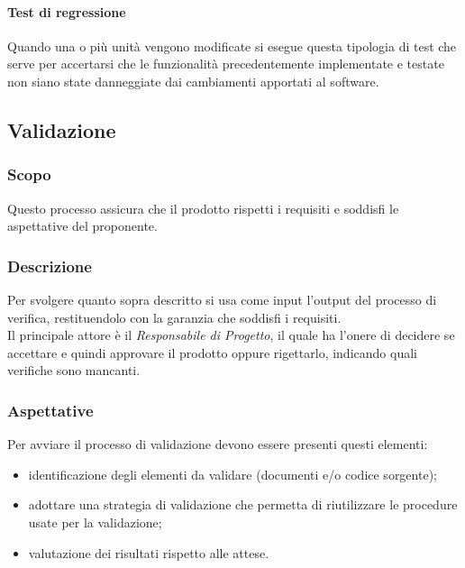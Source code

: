 \paragraph{Test di regressione}
Quando una o più unità vengono modificate si esegue questa tipologia di test che serve per accertarsi che le funzionalità precedentemente implementate e testate non siano state danneggiate dai cambiamenti apportati al software.


\subsection{Validazione}
\label{_validazione}
\subsubsection{Scopo}
Questo processo assicura che il prodotto rispetti i requisiti e soddisfi le aspettative del proponente.

\subsubsection{Descrizione}
Per svolgere quanto sopra descritto si  usa come input l'output del processo di verifica,
restituendolo con la garanzia che soddisfi i requisiti.\\
Il principale attore è il \textit{Responsabile di Progetto}, il quale ha l'onere di decidere
se accettare e quindi approvare il prodotto oppure rigettarlo, indicando quali verifiche sono mancanti.

\subsubsection{Aspettative}
Per avviare il processo di validazione devono essere presenti questi elementi:
\begin{itemize}
    \item identificazione degli elementi da validare (documenti e/o codice sorgente);
    \item adottare una strategia di validazione che permetta di riutilizzare le procedure usate
          per la validazione;
    \item valutazione dei risultati rispetto alle attese.
\end{itemize}

